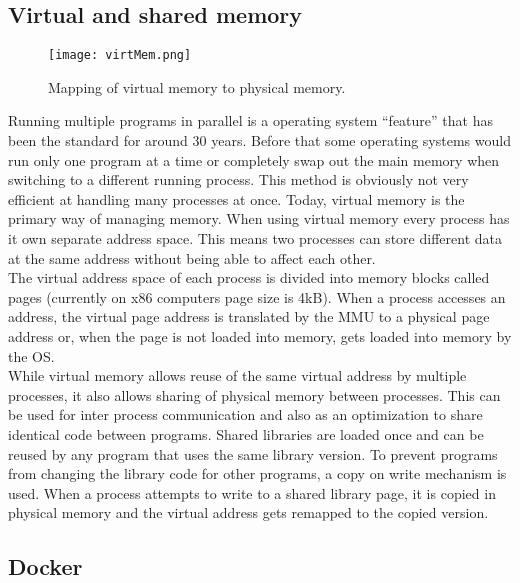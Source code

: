 \documentclass[conference,compsoc,final,a4paper]{IEEEtran}
\begin{document}
\subsection{Virtual and shared memory}
\begin{figure}[!ht]
\centering
\texttt{[image: virtMem.png]}
\caption{Mapping of virtual memory to physical memory. \cite{tanenbaum1997operating}}
\label{virtmem}
\end{figure}
Running multiple programs in parallel is a operating system \enquote{feature} that has been the standard for around 30 years. Before that some operating systems would run only one program at a time or completely swap out the main memory when switching to a different running process. \cite{tanenbaum1997operating} This method is obviously not very efficient at handling many processes at once. Today, virtual memory is the primary way of managing memory. When using virtual memory every process has it own separate address space. This means two processes can store different data at the same address without being able to affect each other. \cite[p.~620]{hennessy2011computer}\\
The virtual address space of each process is divided into memory blocks called pages (currently on x86 computers page size is 4kB). When a process accesses an address, the virtual page address is translated by the \ac{MMU} to a physical page address or, when the page is not loaded into memory, gets loaded into memory by the OS. \\
While virtual memory allows reuse of the same virtual address by multiple processes, it also allows sharing of physical memory between processes. This can be used for inter process communication and also as an optimization to share identical code between programs. Shared libraries are loaded once and can be reused by any program that uses the same library version. \cite{tanenbaum1997operating} To prevent programs from changing the library code for other programs, a copy on write mechanism is used. When a process attempts to write to a shared library page, it is copied in physical memory and the virtual address gets remapped to the copied version. \cite[p.~295]{bovet2005understanding}
\subsection{Docker}
\end{document}
